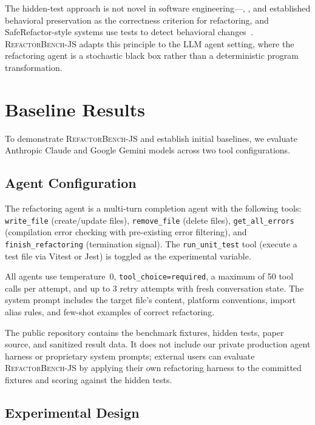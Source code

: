 \documentclass[11pt,letterpaper]{article}
\begin{document}
The hidden-test approach is not novel in software engineering---\citet{opdyke1992refactoring}, \citet{griswold1993automated}, and \citet{fowler1999refactoring} established behavioral preservation as the correctness criterion for refactoring, and SafeRefactor-style systems use tests to detect behavioral changes~\citep{soares2013automated}. \textsc{RefactorBench}-JS adapts this principle to the LLM agent setting, where the refactoring agent is a stochastic black box rather than a deterministic program transformation.

\section{Baseline Results}
\label{sec:baselines}

To demonstrate \textsc{RefactorBench}-JS and establish initial baselines, we evaluate Anthropic Claude and Google Gemini models across two tool configurations.

\subsection{Agent Configuration}

The refactoring agent is a multi-turn completion agent with the following tools: \texttt{write\_file} (create/update files), \texttt{remove\_file} (delete files), \texttt{get\_all\_errors} (compilation error checking with pre-existing error filtering), and \texttt{finish\_refactoring} (termination signal). The \texttt{run\_unit\_test} tool (execute a test file via Vitest or Jest) is toggled as the experimental variable.

All agents use temperature~0, \texttt{tool\_choice=required}, a maximum of 50 tool calls per attempt, and up to 3 retry attempts with fresh conversation state. The system prompt includes the target file's content, platform conventions, import alias rules, and few-shot examples of correct refactoring.

The public repository contains the benchmark fixtures, hidden tests, paper source, and sanitized result data. It does not include our private production agent harness or proprietary system prompts; external users can evaluate \textsc{RefactorBench}-JS by applying their own refactoring harness to the committed fixtures and scoring against the hidden tests.

\subsection{Experimental Design}
\end{document}
